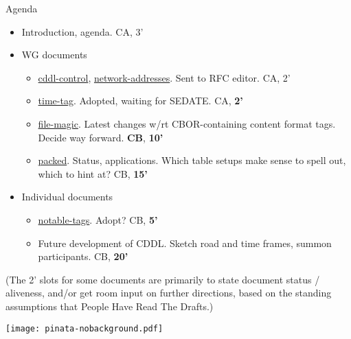 \documentclass[aspectratio=169]{beamer}
\begin{document}
\begin{frame}{Agenda}\large
    \begin{itemize}
        \item Introduction, agenda. CA, 3’

        \item WG documents
            \begin{itemize}
                \item \href{https://datatracker.ietf.org/doc/draft-ietf-cbor-cddl-control/}{cddl-control},
                    \href{https://datatracker.ietf.org/doc/draft-ietf-cbor-network-addresses/}{network-addresses}.
                    Sent to RFC editor. CA, 2'
                \item \href{https://datatracker.ietf.org/doc/draft-ietf-cbor-time-tag/}{time-tag}. Adopted, waiting for SEDATE. CA, \textbf{2'}
                \item \href{https://datatracker.ietf.org/doc/draft-ietf-cbor-file-magic/}{file-magic}. Latest changes w/rt CBOR-containing content format tags. Decide way forward. \textbf{CB}, \textbf{10'}
                \item \href{https://datatracker.ietf.org/doc/draft-ietf-cbor-packed/}{packed}. Status, applications. Which table setups make sense to spell out, which to hint at? CB, \textbf{15'}
            \end{itemize}

            \item Individual documents
            \begin{itemize}
                \item \href{https://datatracker.ietf.org/doc/draft-bormann-cbor-edn-literals/}{notable-tags}. Adopt? CB, \textbf{5'}
                \item Future development of CDDL. Sketch road and time frames, summon participants. CB, \textbf{20'}
            \end{itemize}
    \end{itemize}

    \small (The 2’ slots for some documents are primarily to state document status / aliveness, and/or get room input on further directions, based on the standing assumptions that People Have Read The Drafts.)

    \vspace{-3cm}
    \begin{block}{\texttt{[image: pinata-nobackground.pdf]}\mbox{\quad}}
    \end{block}
\end{frame}
\end{document}

